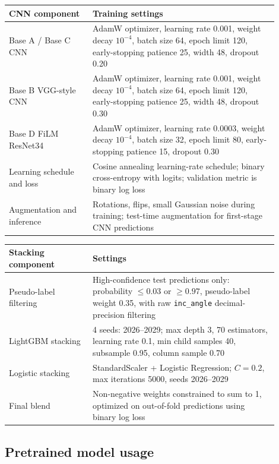 \documentclass[11pt]{article}
\begin{document}
\begin{center}
\begin{tabular}{p{0.28\linewidth}p{0.62\linewidth}}
\toprule
CNN component & Training settings \\
\midrule
Base A / Base C CNN & AdamW optimizer, learning rate 0.001, weight decay $10^{-4}$, batch size 64, epoch limit 120, early-stopping patience 25, width 48, dropout 0.20 \\
Base B VGG-style CNN & AdamW optimizer, learning rate 0.001, weight decay $10^{-4}$, batch size 64, epoch limit 120, early-stopping patience 25, width 48, dropout 0.30 \\
Base D FiLM ResNet34 & AdamW optimizer, learning rate 0.0003, weight decay $10^{-4}$, batch size 32, epoch limit 80, early-stopping patience 15, dropout 0.30 \\
Learning schedule and loss & Cosine annealing learning-rate schedule; binary cross-entropy with logits; validation metric is binary log loss \\
Augmentation and inference & Rotations, flips, small Gaussian noise during training; test-time augmentation for first-stage CNN predictions \\
\bottomrule
\end{tabular}
\end{center}

\begin{center}
\begin{tabular}{p{0.28\linewidth}p{0.62\linewidth}}
\toprule
Stacking component & Settings \\
\midrule
Pseudo-label filtering & High-confidence test predictions only: probability $\leq 0.03$ or $\geq 0.97$, pseudo-label weight 0.35, with raw \texttt{inc\_angle} decimal-precision filtering \\
LightGBM stacking & 4 seeds: 2026--2029; max depth 3, 70 estimators, learning rate 0.1, min child samples 40, subsample 0.95, column sample 0.70 \\
Logistic stacking & StandardScaler + Logistic Regression; $C=0.2$, max iterations 5000, seeds 2026--2029 \\
Final blend & Non-negative weights constrained to sum to 1, optimized on out-of-fold predictions using binary log loss \\
\bottomrule
\end{tabular}
\end{center}

\subsection{Pretrained model usage}
\end{document}
